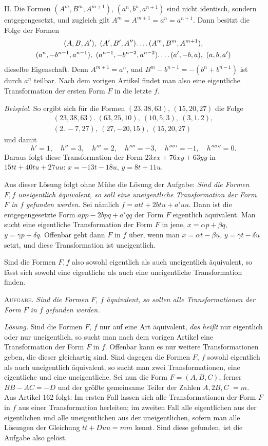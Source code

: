 II. Die Formen $(A^m,B^m,A^{m+1})$, $(a^n,b^n,a^{n+1})$ sind nicht identisch, sondern entgegengesetzt, und zugleich gilt $A^m=A^{m+1}=a^n=a^{n+1}$. Dann besitzt die Folge der Formen
\[
\begin{gathered}
(A,B,A'),\ (A',B',A'')\ldotp\ldotp\ldotp\ldotp(A^m,B^m,A^{m+1}),\\
(a^n,-b^{n-1},a^{n-1}),\ (a^{n-1},-b^{n-2},a^{n-2})\ldotp\ldotp\ldotp\ldotp(a',-b,a),\ (a,b,a')
\end{gathered}
\]
dieselbe Eigenschaft. Denn $A^{m+1}=a^n$, und $B^m-b^{n-1}=-(b^n+b^{n-1})$ ist durch $a^n$ teilbar. Nach dem vorigen Artikel findet man also eine eigentliche Transformation der ersten Form $F$ in die letzte $f$.

\emph{Beispiel.} So ergibt sich für die Formen $(23.\,38,63)$, $(15,20,27)$ die Folge
\[
\begin{gathered}
(23,38,63).\ (63,25,10),\ (10,5,3),\ (3,1.\,2),\\
(2.\,-7,27),\ (27,-20,15),\ (15,20,27)
\end{gathered}
\]
und damit
\[
h'=1,\quad h''=3,\quad h'''=2,\quad h''''=-3,\quad h'''''=-1,\quad h''''''=0.
\]
Daraus folgt diese Transformation der Form $23xx+76xy+63yy$ in $15tt+40tu+27uu$: $x=-13t-18u$, $y=8t+11u$.

Aus dieser Lösung folgt ohne Mühe die Lösung der Aufgabe: \emph{Sind die Formen $F,f$ uneigentlich äquivalent, so soll eine uneigentliche Transformation der Form $F$ in $f$ gefunden werden.} Sei nämlich $f=att+2btu+a'uu$. Dann ist die entgegengesetzte Form $app-2bpq+a'qq$ der Form $F$ eigentlich äquivalent. Man sucht eine eigentliche Transformation der Form $F$ in jene, $x=\alpha p+\beta q$, $y=\gamma p+\delta q$. Offenbar geht dann $F$ in $f$ über, wenn man $x=\alpha t-\beta u$, $y=\gamma t-\delta u$ setzt, und diese Transformation ist uneigentlich.

Sind die Formen $F,f$ also sowohl eigentlich als auch uneigentlich äquivalent, so lässt sich sowohl eine eigentliche als auch eine uneigentliche Transformation finden.

\textsc{Aufgabe.} \emph{Sind die Formen $F$, $f$ äquivalent, so sollen alle Transformationen der Form $F$ in $f$ gefunden werden.}

\emph{Lösung.} Sind die Formen $F$, $f$ nur auf eine Art äquivalent, \emph{das heißt} nur eigentlich oder nur uneigentlich, so sucht man nach dem vorigen Artikel eine Transformation der Form $F$ in $f$. Offenbar kann es nur weitere Transformationen geben, die dieser gleichartig sind. Sind dagegen die Formen $F$, $f$ sowohl eigentlich als auch uneigentlich äquivalent, so sucht man zwei Transformationen, eine eigentliche und eine uneigentliche. Sei nun die Form $F=(A,B,C)$, ferner $BB-AC=-D$ und der größte gemeinsame Teiler der Zahlen $A,2B,C$ $=m$. Aus Artikel 162 folgt: Im ersten Fall lassen sich alle Transformationen der Form $F$ in $f$ aus einer Transformation herleiten; im zweiten Fall alle eigentlichen aus der eigentlichen und alle uneigentlichen aus der uneigentlichen, sofern man alle Lösungen der Gleichung $tt+Duu=mm$ kennt. Sind diese gefunden, ist die Aufgabe also gelöst.

